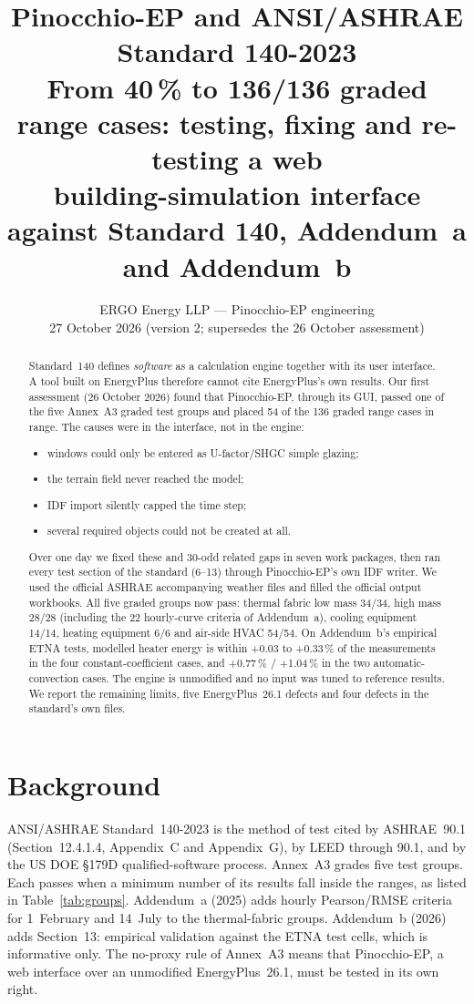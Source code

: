 \documentclass[10pt,a4paper]{article}
\title{\textbf{Pinocchio-EP and ANSI/ASHRAE Standard 140-2023}\\[3pt]
\large From 40\,\% to 136/136 graded range cases: testing, fixing and re-testing a web\\
building-simulation interface against Standard 140, Addendum~a and Addendum~b}
\author{ERGO Energy LLP --- Pinocchio-EP engineering\\\small 27 October 2026 (version 2; supersedes the 26 October assessment)}
\date{}
\begin{document}
\maketitle

\begin{abstract}\noindent
Standard~140 defines \emph{software} as a calculation engine together with its user interface. A tool built on
EnergyPlus therefore cannot cite EnergyPlus's own results. Our first assessment (26 October 2026) found that
Pinocchio-EP, through its GUI, passed one of the five Annex~A3 graded test groups and placed 54 of the 136 graded
range cases in range. The causes were in the interface, not in the engine:
\begin{itemize}
\item windows could only be entered as U-factor/SHGC simple glazing;
\item the terrain field never reached the model;
\item IDF import silently capped the time step;
\item several required objects could not be created at all.
\end{itemize}
Over one day we fixed these and 30-odd related gaps in seven work packages, then ran every test section of the
standard (6--13) through Pinocchio-EP's own IDF writer. We used the official ASHRAE accompanying weather files and
filled the official output workbooks. All five graded groups now pass: thermal fabric low mass 34/34, high mass
28/28 (including the 22 hourly-curve criteria of Addendum~a), cooling equipment 14/14, heating equipment 6/6 and
air-side HVAC 54/54. On Addendum~b's empirical ETNA tests, modelled heater energy is within +0.03 to +0.33\,\% of
the measurements in the four constant-coefficient cases, and +0.77\,\% / +1.04\,\% in the two automatic-convection
cases. The engine is unmodified and no input was tuned to reference results. We report the remaining limits, five
EnergyPlus~26.1 defects and four defects in the standard's own files.
\end{abstract}

\section{Background}
ANSI/ASHRAE Standard~140-2023 is the method of test cited by ASHRAE~90.1 (Section~12.4.1.4, Appendix~C and
Appendix~G), by LEED through 90.1, and by the US DOE \S179D qualified-software process. Annex~A3 grades five test
groups. Each passes when a minimum number of its results fall inside the ranges, as listed in
Table~\ref{tab:groups}. Addendum~a (2025) adds hourly Pearson/RMSE criteria for 1~February and 14~July to the
thermal-fabric groups. Addendum~b (2026) adds Section~13: empirical validation against the ETNA test cells, which
is informative only. The no-proxy rule of Annex~A3 means that Pinocchio-EP, a web interface over an unmodified
EnergyPlus~26.1, must be tested in its own right.
\end{document}
